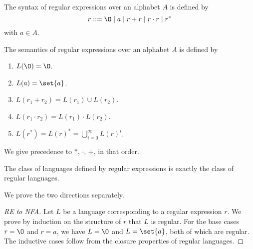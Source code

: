 \begin{definition} \label{def:regex}
    The syntax of regular expressions over an alphabet $A$ is defined by \[
        r ::= \O \mid a \mid r + r \mid r \cdot r \mid r^*
    \] with $a \in A$.

    The semantics of regular expressions over an alphabet $A$ is defined by
    \begin{enumerate}
        \item $L(\O) = \O$.
        \item $L(a) = \set{a}$.
        \item $L(r_1 + r_2) = L(r_1) \cup L(r_2)$.
        \item $L(r_1 \cdot r_2) = L(r_1) \cdot L(r_2)$.
        \item $L(r^*) = L(r)^* = \bigcup_{i = 0}^\infty L(r)^i$.
    \end{enumerate}
    We give precedence to $*$, $\cdot$, $+$, in that order.
\end{definition}

\begin{theorem} \label{thm:regex:kleene}
    The class of languages defined by regular expressions is exactly the
    class of regular languages.
\end{theorem}
We prove the two directions separately.
\begin{proof}[RE to NFA]
    Let $L$ be a language corresponding to a regular expression $r$.
    We prove by induction on the structure of $r$ that $L$ is regular.
    For the base cases $r = \O$ and $r = a$, we have $L = \O$ and
    $L = \set{a}$, both of which are regular.
    The inductive cases follow from the closure properties of regular
    languages.
\end{proof}
